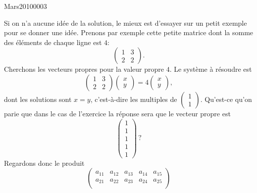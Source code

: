 

\begin{corrige}{Mars20100003}

	Si on n'a aucune idée de la solution, le mieux est d'essayer sur un petit exemple pour se donner une idée. Prenons par exemple cette petite matrice dont la somme des éléments de chaque ligne est $4$:
	\begin{equation}
		\begin{pmatrix}
			1	&	3	\\ 
			2	&	2	
		\end{pmatrix}.
	\end{equation}
	Cherchons les vecteurs propres pour la valeur propre $4$. Le système à résoudre est
	\begin{equation}
		\begin{pmatrix}
			1	&	3	\\ 
			2	&	2	
		\end{pmatrix}\begin{pmatrix}
			x	\\ 
			y	
		\end{pmatrix}=4\begin{pmatrix}
			x	\\ 
			y	
		\end{pmatrix},
	\end{equation}
	dont les solutions sont $x=y$, c'est-à-dire les multiples de $\begin{pmatrix}
		1	\\ 
		1	
	\end{pmatrix}$.
	Qu'est-ce qu'on parie que dans le cas de l'exercice la réponse sera que le vecteur propre est
	\begin{equation}
		\begin{pmatrix}
			1	\\ 
			1	\\ 
			1	\\ 
			1	\\ 
			1	
		\end{pmatrix}\, ?
	\end{equation}
	Regardons donc le produit
	\begin{equation}
		\begin{pmatrix}
			a_{11}	&	a_{12}	&	a_{13}	&	a_{14}	&	a_{15}\\	
			a_{21}	&	a_{22}	&	a_{23}	&	a_{24}	&	a_{25}\\	

\end{pmatrix}
\end{equation}
\end{corrige}
